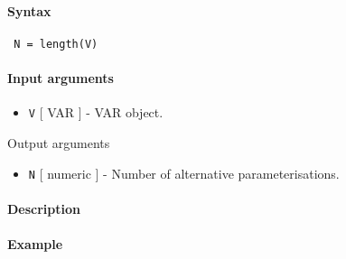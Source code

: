


	\paragraph{Syntax}
 
 \begin{verbatim}
 N = length(V)
 \end{verbatim}
 
 \paragraph{Input arguments}
 
 \begin{itemize}
 \item
   \texttt{V} {[} VAR {]} - VAR object.
 \end{itemize}
 
 Output arguments
 
 \begin{itemize}
 \item
   \texttt{N} {[} numeric {]} - Number of alternative parameterisations.
 \end{itemize}
 
 \paragraph{Description}
 
 \paragraph{Example}


